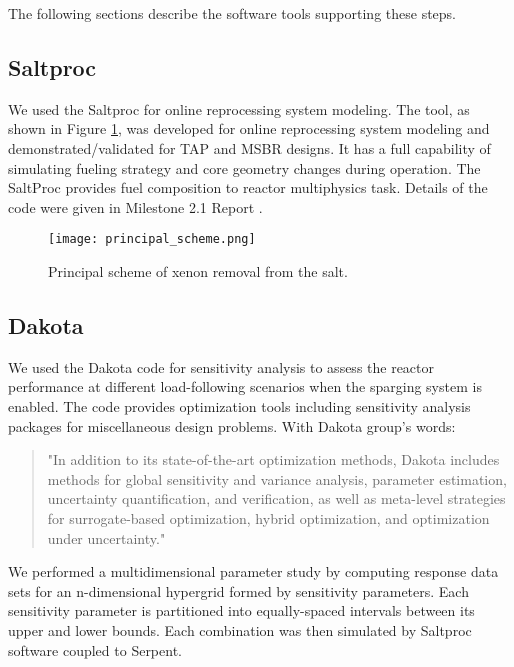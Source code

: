 \begin{itemize}
The following sections describe the software tools supporting these steps.
\subsection{Saltproc}

    We used the Saltproc \cite{rykhlevskii_saltproc_2018} for online 
    reprocessing system modeling. The tool, as shown in Figure 
    \ref{fig:scheme}, was developed for online reprocessing system modeling and 
    demonstrated/validated for TAP and MSBR designs. It has a full capability 
    of simulating fueling strategy and core geometry changes during operation. 
    The SaltProc provides fuel composition to reactor multiphysics task. 
    Details of the code were given in Milestone 2.1 Report 
    \cite{rykhlevskii_milestone_2019}.

    \begin{figure}[h]
        \begin{center}
            \texttt{[image: principal\_scheme.png]}
        \end{center}
        \caption{Principal scheme of xenon removal from the salt.}
        \label{fig:scheme}
    \end{figure}

\subsection{Dakota}

    We used the Dakota code \cite{adams_dakota_2019} for sensitivity analysis 
    to assess the reactor performance at different load-following scenarios when 
    the sparging system is enabled. The code provides optimization tools 
    including sensitivity analysis packages for miscellaneous design problems. 
    With Dakota group's words:

    \begin{quote}
        "In addition to its state-of-the-art optimization methods, Dakota
        includes methods for global sensitivity and variance analysis, 
            parameter
        estimation, uncertainty quantification, and verification, as well as
        meta-level strategies for surrogate-based optimization, hybrid
        optimization, and optimization under uncertainty."
    \end{quote}

    We performed a multidimensional parameter study by computing response data 
    sets for an n-dimensional hypergrid formed by sensitivity parameters. Each 
    sensitivity parameter is partitioned into equally-spaced intervals between 
    its upper and lower bounds. Each combination was then simulated by Saltproc 
    software coupled to Serpent.


\end{itemize}

